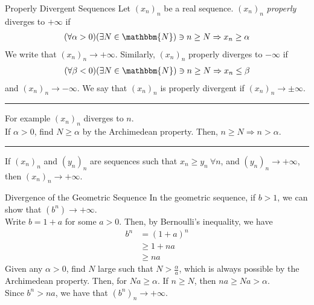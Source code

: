 \documentclass[10pt]{extarticle}
\newcommand{\N}{\mathbbm{N}}
\begin{document}
  \begin{problem}{Properly Divergent Sequences}
    Let $(x_n)_n$ be a real sequence. $(x_n)_n$ \textsl{properly} diverges to $+\infty$ if
    \begin{align*}
      (\forall \alpha > 0)(\exists N\in\N) \ni n\geq N \Rightarrow x_{n} \geq \alpha
    \end{align*}
    We write that $(x_n)_n \rightarrow +\infty$. Similarly, $(x_n)_n$ properly diverges to $-\infty$ if
    \begin{align*}
      (\forall \beta < 0)(\exists N\in\N) \ni n\geq N \Rightarrow x_n \leq \beta
    \end{align*}
    and $(x_n)_n \rightarrow -\infty$. We say that $(x_n)_n$ is properly divergent if $(x_n)_n\rightarrow \pm \infty$.\\
    \vspace{4pt}
    \rule{\textwidth}{0.4pt}
    \vspace{4pt}
    For example $(x_n)_n$ diverges to $n$.\\

    If $\alpha > 0$, find $N \geq \alpha$ by the Archimedean property. Then, $n\geq N \Rightarrow n > \alpha$.\\
    \vspace{4pt}
    \rule{\textwidth}{0.4pt}
    \vspace{4pt}
    If $(x_n)_n$ and $(y_n)_n$ are sequences such that $x_n \geq y_n~\forall n$, and $(y_n)_n \rightarrow +\infty$, then $(x_n)_n \rightarrow +\infty$.
  \end{problem}
  \begin{problem}{Divergence of the Geometric Sequence}
    In the geometric sequence, if $b > 1$, we can show that $\left(b^n\right) \rightarrow +\infty$.\\

    Write $b = 1 + a$ for some $a > 0$. Then, by Bernoulli's inequality, we have
    \begin{align*}
      b^n &= (1+a)^n \\
          &\geq 1 + na\\
          &\geq na
    \end{align*}
    Given any $\alpha > 0$, find $N$ large such that $N > \frac{\alpha}{a}$, which is always possible by the Archimedean property. Then, for $Na \geq \alpha$. If $n\geq N$, then $na \geq Na > \alpha$.\\

    Since $b^n > na$, we have that $\left(b^n\right)_n \rightarrow +\infty$.
  \end{problem}
\end{document}
